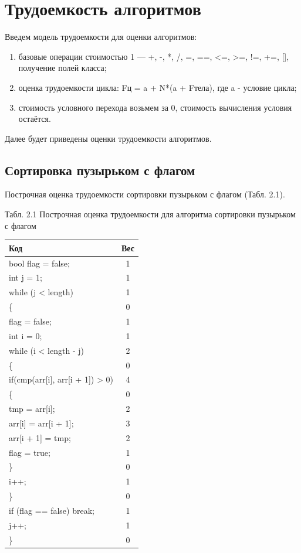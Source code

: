 \documentclass{report}
\begin{document}
\section{Трудоемкость алгоритмов}
Введем модель трудоемкости для оценки алгоритмов:
\begin{enumerate}
  	\item  базовые операции стоимостью 1 — +, -, *, /, =, ==, <=, >=, !=, +=, [], получение полей класса;
	\item оценка трудоемкости цикла: Fц = a + N*(a + Fтела), где a - условие цикла;
	\item стоимость условного перехода возьмем за 0, стоимость вычисления условия остаётся.
\end{enumerate}

Далее будет приведены оценки трудоемкости алгоритмов. 

\subsection{Сортировка пузырьком с флагом}
Построчная оценка трудоемкости сортировки пузырьком с флагом (Табл. 2.1).
\begin{center}
Табл. 2.1 Построчная оценка трудоемкости для алгоритма сортировки пузырьком с флагом

	\begin{tabular}{|l c|} 
 	\hline
	Код & Вес \\ [0.5ex] 
 	\hline
	bool flag = false; & 1\\
	\hline
	int j = 1; & 1\\
 	\hline
	while (j < length) & 1\\
	\hline
	\{ & 0\\
	\hline
	flag = false; & 1\\
	\hline
	int i = 0; & 1\\
 	\hline
	while (i < length - j) & 2\\
	\hline
	\{ & 0\\	
	\hline
	if(cmp(arr[i], arr[i + 1]) > 0) & 4\\
	\hline
	\{ & 0\\
	\hline
	tmp = arr[i]; & 2\\
	\hline
    arr[i] = arr[i + 1]; & 3\\
    \hline
    arr[i + 1] = tmp; & 2\\
    \hline
    flag = true; & 1\\
    \hline
    \} & 0\\
	\hline
	i++; & 1\\
	\hline
	\} & 0\\
	\hline
	if (flag == false) break;  & 1\\
	\hline
	j++; & 1\\
	\hline
	\} & 0\\
	\hline
	\end{tabular}
\end{center}
\end{document}
